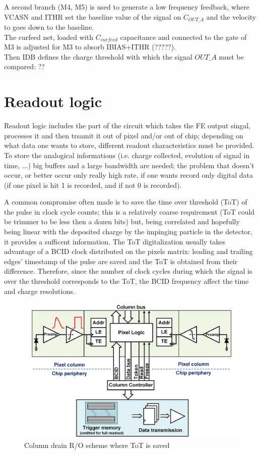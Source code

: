      A second branch (M4, M5) is used to generate a low frequency feedback, where VCASN and ITHR set the baseline value of the signal on $C_{OUT\_A}$ and the velocity to goes down to the baseline.\\
      The curfeed net, loaded with $C_{curfeed}$ capacitance and connected to the gate of M3 is adjusted for M3 to absorb IBIAS+ITHR (?????).\\
      Then IDB defines the charge threshold with which the signal $OUT\_A$ must be compared: ??
      
\section{Readout logic}
   Readout logic includes the part of the circuit which takes the FE output singal, processes it and then trsamit it out of pixel and/or out of chip; depending on what data one wants to store, different readout characteristics must be provided. \\
   To store the analogical informations (i.e. charge collected, evolution of signal in time, ...) big buffers and a large bandwidth are needed; the problem that doesn't occur, or better occur only really high rate, if one wants record only digital data (if one pixel is hit 1 is recorded, and if not 0 is recorded). 

   A common compromise often made is to save the time over threshold (ToT) of the pulse in clock cycle counts; this is a relatively coarse requirement (ToT could be trimmer to be less then a dozen bits) but, being correlated and hopefully being linear with the deposited charge by the impinging particle in the detector, it provides a sufficent information.
   The ToT digitalization usually takes advantage of a BCID clock distributed on the pixels matrix: leading and trailing edges' timestamp of the pulse are saved and the ToT is obtained from their difference. Therefore, since the number of clock cycles during which the signal is over the threshold corresponds to the ToT, the BCID frequency affect the time and charge resolutions.
   \begin{figure}[h!]
      \centering
      \includegraphics[width=.7\linewidth]{figures/Pixel_detectors/column_drain_RO.png}
      \caption{Column drain R/O scheme where ToT is saved}
      \label{fig:column_drain_RO-like}
   \end{figure}

